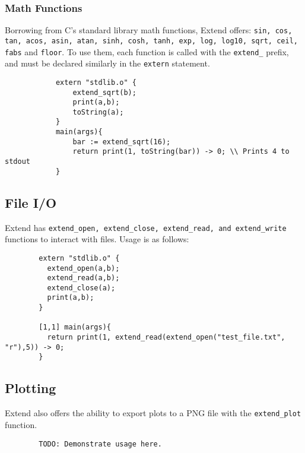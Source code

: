 		\subsubsection{Math Functions}
		Borrowing from C's standard library math functions, Extend offers: \texttt{sin, cos, tan, acos, asin, atan, sinh, cosh, tanh, exp, log, log10, sqrt, ceil, fabs} and \texttt{floor}.
		To use them, each function is called with the \texttt{extend\_} prefix, and must be declared similarly in the \texttt{extern} statement.

		\begin{lstlisting}
			extern "stdlib.o" {
				extend_sqrt(b);
				print(a,b);
				toString(a);
			}
			main(args){
				bar := extend_sqrt(16);
				return print(1, toString(bar)) -> 0; \\ Prints 4 to stdout
			}
		\end{lstlisting}

	\subsection{File I/O}
	Extend has \texttt{extend\_open, extend\_close, extend\_read, and extend\_write} functions to interact with files. Usage is as follows:

	\begin{lstlisting}
		extern "stdlib.o" {
		  extend_open(a,b);
		  extend_read(a,b);
		  extend_close(a);
		  print(a,b);
		}

		[1,1] main(args){
		  return print(1, extend_read(extend_open("test_file.txt", "r"),5)) -> 0;
		}
	\end{lstlisting}

	\subsection{Plotting}
	Extend also offers the ability to export plots to a PNG file with the \texttt{extend\_plot} function.

	\begin{lstlisting}
		TODO: Demonstrate usage here.
	\end{lstlisting}
